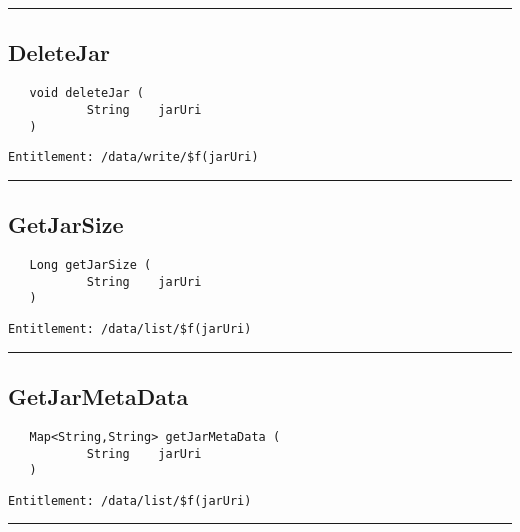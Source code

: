 \rule{12cm}{2pt}
\subsection{DeleteJar}
\label{Api:DeleteJar}
\begin{verbatim}
   void deleteJar (
           String    jarUri
   )
\end{verbatim}
\begin{Verbatim}[fontsize=\small, formatcom=\color{Maroon}]
  Entitlement: /data/write/$f(jarUri)
\end{Verbatim}



\rule{12cm}{2pt}
\subsection{GetJarSize}
\label{Api:GetJarSize}
\begin{verbatim}
   Long getJarSize (
           String    jarUri
   )
\end{verbatim}
\begin{Verbatim}[fontsize=\small, formatcom=\color{Maroon}]
  Entitlement: /data/list/$f(jarUri)
\end{Verbatim}



\rule{12cm}{2pt}
\subsection{GetJarMetaData}
\label{Api:GetJarMetaData}
\begin{verbatim}
   Map<String,String> getJarMetaData (
           String    jarUri
   )
\end{verbatim}
\begin{Verbatim}[fontsize=\small, formatcom=\color{Maroon}]
  Entitlement: /data/list/$f(jarUri)
\end{Verbatim}



\rule{12cm}{2pt}
